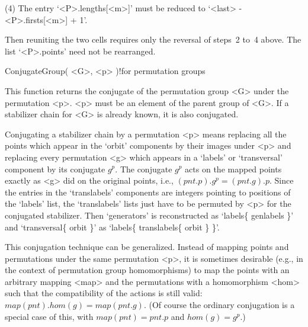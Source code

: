 (4) The entry    `<P>.lengths[<m>]'  must   be  reduced  to   `<last>   -
<P>.firsts[<m>] + 1'.

Then reuniting the  two cells requires  only the reversal of steps~2 to~4
above. The list `<P>.points' need not be rearranged.


\>ConjugateGroup( <G>, <p> )!{for permutation groups}

This function  returns the conjugate  of the  permutation group <G> under
the permutation <p>. <p> must  be an element of  the parent group of <G>.
If a stabilizer chain for <G> is already known, it is also conjugated.

\danger Conjugating   a  stabilizer  chain by   a permutation   <p> means
replacing all the points which appear in  the `orbit' components by their
images under  <p> and replacing every  permutation <g> which appears in a
`labels' or `transversal' component by its conjugate $g^p$. The conjugate
$g^p$ acts on  the  mapped points  exactly   as <g> did on  the  original
points, i.e.,  $(pnt.p). g^p  =  (pnt.g).p$. Since   the entries  in  the
`translabels' components are  integers    pointing to positions of    the
`labels' list, the  `translabels' lists just  have to be permuted by  <p>
for the conjugated  stabilizer. Then   `generators' is reconstructed   as
`labels\{  genlabels   \}'  and `transversal\{  orbit   \}'  as `labels\{
translabels\{ orbit \} \}'.

This    conjugation technique    can be    generalized.  Instead of mapping  points and permutations under
the same permutation <p>, it is sometimes desirable (e.g., in the context
of permutation  group homomorphisms) to  map the points with an arbitrary
mapping <map>  and the permutations with  a homomorphism <hom>  such that
the  compatibility  of the actions is  still   valid: $map(pnt). hom(g) =
map(pnt.g)$. (Of course   the ordinary conjugation is  a  special case of
this, with $map(pnt) = pnt.p$ and $hom(g) = g^p$.)

